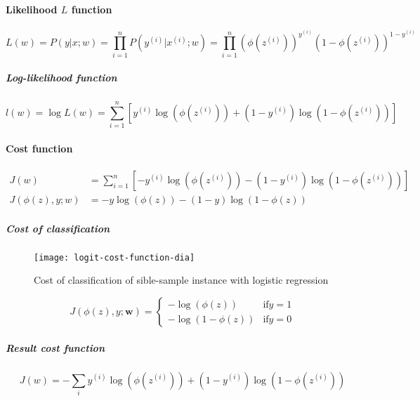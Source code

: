 \documentclass{article}
\begin{document}
			\paragraph{Likelihood $L$ function}
			
			\begin{equation}
				L(w) = P(y| x; w) = \prod_{i=1}^n P(y^{(i)} | x^{(i)}; w) = \prod_{i=1}^n (\phi(z^{(i)}))^{y^{(i)}}(1-\phi(z^{(i)}))^{1-y^{(i)}}
			\end{equation}
			
			\subparagraph{Log-likelihood function}
			
			\begin{equation}
				l(w) = \log L(w) = \sum_{i=1}^n [y^{(i)}\log(\phi(z^{(i)}))+(1-y^{(i)})\log(1-\phi(z^{(i)}))]
			\end{equation}
			
			\paragraph{Cost function}
			
			\begin{equation}
				\begin{aligned}
					J(w) &= \sum_{i=1}^n[-y^{(i)}\log(\phi(z^{(i)}))-(1-y^{(i)})\log(1-\phi(z^{(i)}))] \\
					J(\phi(z), y; w) &= - y \log(\phi(z))-(1-y)\log(1-\phi(z))			
				\end{aligned}
			\end{equation}
			
			\subparagraph{Cost of classification}
			
			\begin{figure}
				\centering
				\texttt{[image: logit-cost-function-dia]}
				\caption{Cost of classification of sible-sample instance with logistic regression}
				\label{fig:logit-cost-function-dia}
			\end{figure}
			
			\begin{equation}
				J(\phi(z), y; \boldsymbol{w}) = \begin{cases} -\log(\phi(z)) &\mbox{if} y=1 \\ -\log(1-\phi(z)) &\mbox{if} y=0 \end{cases}
			\end{equation}
			
			\subparagraph{Result cost function}
			
			\begin{equation}
				J(w) = - \sum_i y^{(i)} \log(\phi(z^{(i)})) + (1-y^{(i)}) \log(1-\phi(z^{(i)}))
			\end{equation}
			
\end{document}
